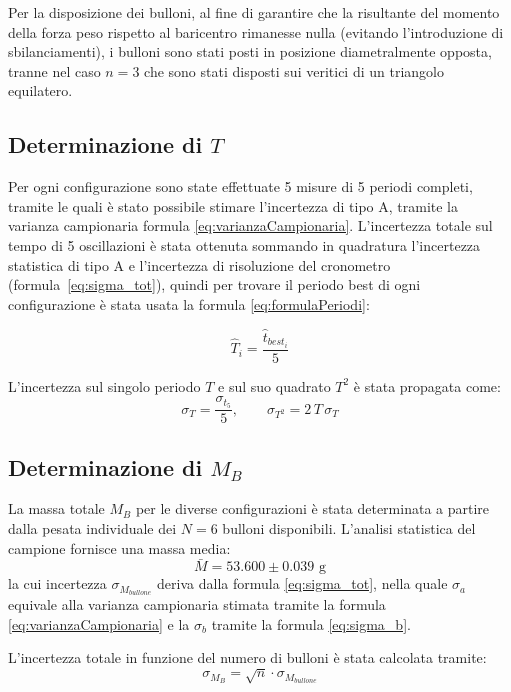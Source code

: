 \documentclass{article}
\begin{document}
Per la disposizione dei bulloni, al fine di garantire che la risultante del momento della forza peso rispetto al baricentro rimanesse nulla (evitando l'introduzione di sbilanciamenti), i bulloni sono stati posti in posizione diametralmente opposta, tranne nel caso $n = 3$ che sono stati disposti sui veritici di un triangolo equilatero.

\subsection{Determinazione di $T$}
Per ogni configurazione sono state effettuate 5 misure di 5 periodi completi, tramite le quali è stato possibile stimare l'incertezza di tipo A, tramite la varianza campionaria formula \ref{eq:varianzaCampionaria}.
L'incertezza totale sul tempo di 5 oscillazioni è stata ottenuta sommando in quadratura l'incertezza statistica di tipo A e l'incertezza di risoluzione del cronometro (formula~\ref{eq:sigma_tot}), quindi per trovare il periodo best di ogni configurazione è stata usata la formula \ref{eq:formulaPeriodi}:

\begin{equation}
    \hat{T}_i = \frac{\hat{t}_{best_i}}{5}
    \label{eq:formulaPeriodi}
\end{equation}

L'incertezza sul singolo periodo $T$ e sul suo quadrato $T^2$ è stata propagata come:
\begin{equation}
    \sigma_T = \frac{\sigma_{t_5}}{5}, \qquad \sigma_{T^2} = 2\,T\,\sigma_T
    \label{eq:incT}
\end{equation}

\subsection{Determinazione di $M_B$}
La massa totale $M_B$ per le diverse configurazioni è stata determinata a partire dalla pesata individuale dei $N=6$ bulloni disponibili. L'analisi statistica del campione fornisce una massa media:
\begin{equation}
    \bar{M} = 53.600 \pm 0.039 \text{ g}
\end{equation}
la cui incertezza $\sigma_{M_{bullone}}$ deriva dalla formula \ref{eq:sigma_tot}, nella quale $\sigma_a$ equivale alla varianza campionaria stimata tramite la formula \ref{eq:varianzaCampionaria} e la $\sigma_b$ tramite la formula \ref{eq:sigma_b}.

L'incertezza totale in funzione del numero di bulloni è stata calcolata tramite:
\begin{equation}
    \sigma_{M_B} = \sqrt{n} \cdot \sigma_{M_{bullone}}
\end{equation}
\end{document}

